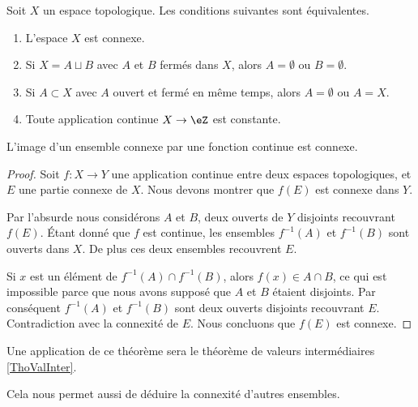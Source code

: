 \begin{proposition} \label{PropHSjJcIr}
    Soit \( X\) un espace topologique. Les conditions suivantes sont équivalentes.
    \begin{enumerate}
        \item
            L'espace \( X\) est connexe.
        \item
            Si \( X=A\sqcup B\) avec \( A\) et \( B\) fermés dans \( X\), alors \( A=\emptyset\) ou \( B=\emptyset\).
        \item
            Si \( A\subset X\) avec \( A\) ouvert et fermé en même temps, alors \( A=\emptyset\) ou \( A=X\).
        \item
            Toute application continue \( X\to \eZ\) est constante.
    \end{enumerate}
\end{proposition}

\begin{proposition}\label{PropGWMVzqb}
    L'image d'un ensemble connexe par une fonction continue est connexe.
\end{proposition}

\begin{proof}
    Soit \( f\colon X\to Y\) une application continue entre deux espaces topologiques, et \( E\) une partie connexe de \( X\). Nous devons montrer que \( f(E)\) est connexe dans \( Y\).

    Par l'absurde nous considérons \( A\) et \( B\), deux ouverts de \( Y\) disjoints recouvrant \( f(E)\). Étant donné que \( f\) est continue, les ensembles \( f^{-1}(A)\) et \( f^{-1}(B)\) sont ouverts dans \( X\). De plus ces deux ensembles recouvrent \( E\).

    Si \( x\) est un élément de \( f^{-1}(A)\cap f^{-1}(B)\), alors \( f(x)\in A\cap B\), ce qui est impossible parce que nous avons supposé que \( A\) et \( B\) étaient disjoints. Par conséquent \( f^{-1}(A)\) et \( f^{-1}(B)\) sont deux ouverts disjoints recouvrant \( E\). Contradiction avec la connexité de \( E\). Nous concluons que \( f(E)\) est connexe.
\end{proof}
Une application de ce théorème sera le théorème de valeurs intermédiaires \ref{ThoValInter}.

Cela nous permet aussi de déduire la connexité d'autres ensembles.

